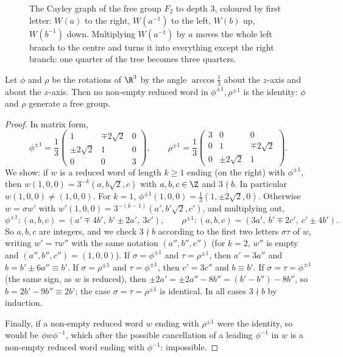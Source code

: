 \begin{figure}[ht]
\centering
{}
\caption{The Cayley graph of the free group $F_2$ to depth $3$, coloured by first letter: $W(a)$ to the right, $W(a^{-1})$ to the left, $W(b)$ up, $W(b^{-1})$ down.
Multiplying $W(a^{-1})$ by $a$ moves the whole left branch to the centre and turns it into everything except the right branch: one quarter of the tree becomes
three quarters.}
\label{fig:freegroup}
\end{figure}

\begin{lemma}[Hausdorff, 1914]\label{lem:freerot}
Let $\phi$ and $\rho$ be the rotations of $\R^3$ by the angle $\arccos\frac13$ about the $z$-axis and about the $x$-axis. Then no non-empty reduced word in
$\phi^{\pm1},\rho^{\pm1}$ is the identity: $\phi$ and $\rho$ generate a free group.
\end{lemma}
\begin{proof}
In matrix form,
\[\phi^{\pm1}=\frac13\begin{pmatrix}1&\mp2\sqrt2&0\\\pm2\sqrt2&1&0\\0&0&3\end{pmatrix},\qquad\rho^{\pm1}=\frac13\begin{pmatrix}3&0&0\\0&1&\mp2\sqrt2\\0&\pm2\sqrt2&1\end{pmatrix}.\]
We show: if $w$ is a reduced word of length $k\ge1$ ending (on the right) with $\phi^{\pm1}$, then $w(1,0,0)=3^{-k}(a,b\sqrt2,c)$ with $a,b,c\in\Z$ and $3\nmid b$. In particular
$w(1,0,0)\ne(1,0,0)$. For $k=1$, $\phi^{\pm1}(1,0,0)=\frac13(1,\pm2\sqrt2,0)$. Otherwise $w=\sigma w'$ with $w'(1,0,0)=3^{-(k-1)}(a',b'\sqrt2,c')$, and multiplying out,
\[\phi^{\pm1}:(a,b,c)=(a'\mp4b',\ b'\pm2a',\ 3c'),\qquad\rho^{\pm1}:(a,b,c)=(3a',\ b'\mp2c',\ c'\pm4b').\]
So $a,b,c$ are integers, and we check $3\nmid b$ according to the first two letters $\sigma\tau$ of $w$, writing $w'=\tau w''$ with the same notation $(a'',b'',c'')$
(for $k=2$, $w''$ is empty and $(a'',b'',c'')=(1,0,0)$). If $\sigma=\phi^{\pm1}$ and $\tau=\rho^{\pm1}$, then $a'=3a''$ and $b=b'\pm6a''\equiv b'$. If $\sigma=\rho^{\pm1}$ and $\tau=\phi^{\pm1}$,
then $c'=3c''$ and $b\equiv b'$. If $\sigma=\tau=\phi^{\pm1}$ (the same sign, as $w$ is reduced), then $\pm2a'=\pm2a''-8b''=(b'-b'')-8b''$, so $b=2b'-9b''\equiv2b'$; the case
$\sigma=\tau=\rho^{\pm1}$ is identical. In all cases $3\nmid b$ by induction.

Finally, if a non-empty reduced word $w$ ending with $\rho^{\pm1}$ were the identity, so would be $\phi w\phi^{-1}$, which after the possible cancellation of a leading
$\phi^{-1}$ in $w$ is a non-empty reduced word ending with $\phi^{-1}$: impossible.
\end{proof}

